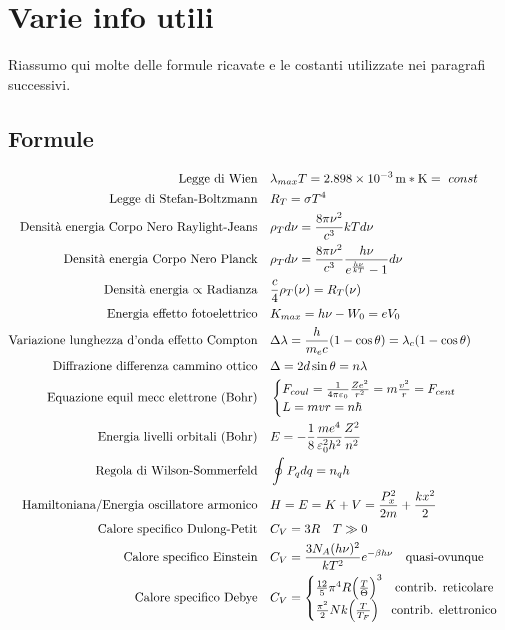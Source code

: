 \section{Varie info utili}
Riassumo qui molte delle formule ricavate e le costanti utilizzate nei paragrafi successivi.
\subsection{Formule}
\begin{equation}
\begin{split}
\mbox{Legge di Wien} & \quad \lambda_{max} T = \SI{2.898e-3}{m*K} = \mbox{ } const \\
\mbox{Legge di Stefan-Boltzmann} & \quad R_T = \sigma T^4 \\
\mbox{Densità energia Corpo Nero Raylight-Jeans} & \quad \rho_T d\nu = \frac{ 8 \pi \nu^2}{c^3 } kT d\nu \\
\mbox{Densità energia Corpo Nero Planck} & \quad  \rho_T d\nu = \frac{ 8 \pi \nu^2}{c^3 }\frac{ h\nu}{e^{ \frac{ h\nu}{kT } } - 1 } d\nu  \\
\mbox{Densità energia $\propto$ Radianza} & \quad \frac{ c}{4 } \rho_T(\nu) = R_T(\nu) \\
\mbox{Energia effetto fotoelettrico} & \quad K_{max} = h\nu - W_0 = eV_0 \\
\mbox{Variazione lunghezza d'onda effetto Compton} & \quad \Delta \lambda = \frac{ h}{m_{e} c } (1 - \cos \theta) = \lambda_c (1 - \cos \theta) \\
\mbox{Diffrazione differenza cammino ottico} & \quad \Delta = 2 d \sin \theta = n \lambda \\
\mbox{Equazione equil mecc elettrone (Bohr)} & \quad 
\begin{cases}
	F_{coul} = \frac{ 1}{4 \pi \varepsilon_0 } \frac{ Z e^2}{r^2 } = m \frac{ v^2}{r } = F_{cent} \\
	L = m v r =  n \hbar
\end{cases} \\
\mbox{Energia livelli orbitali (Bohr)} & \quad E = -\frac{ 1}{8 } \frac{ m e^4}{\varepsilon_0^2 h^2 } \frac{ Z^2}{n^2 } \\
\mbox{Regola di Wilson-Sommerfeld} & \quad \oint P_q dq = n_q h \\
\mbox{Hamiltoniana/Energia oscillatore armonico} & \quad H = E = K + V = \frac{ P_x^2}{2m } + \frac{ k x^2}{2 } \\
\mbox{Calore specifico Dulong-Petit} & \quad C_V = 3R \quad T \gg 0 \\
\mbox{Calore specifico Einstein} & \quad C_V = \frac{ 3 N_A (h\nu)^2}{kT^2 } e^{ -\beta h \nu } \quad \mbox{quasi-ovunque} \\
\mbox{Calore specifico Debye} & \quad C_V = 
	\begin{cases}
		\frac{ 12}{5 } \pi^4 R \Bigl(  \frac{ T}{\Theta }  \Bigr)^3 \quad \mbox{contrib. reticolare} \\
		\frac{ \pi^2}{2 } N k \Bigl(  \frac{ T}{T_F}  \Bigr) \quad \mbox{contrib. elettronico} 
	\end{cases} \\
\end{split}
\end{equation}

